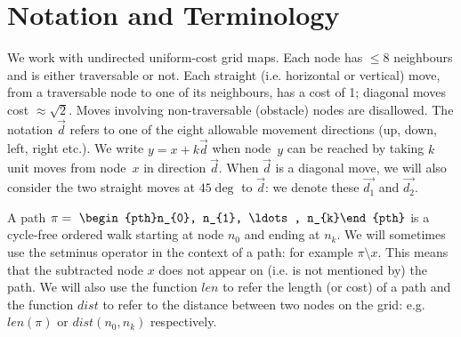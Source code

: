 \section{Notation and Terminology}
\label{sec:notation}
We work with undirected uniform-cost grid maps.  Each node has $\leq 8$
neighbours and is either traversable or not.  Each straight (i.e. horizontal or vertical) move,
from a traversable node to one of its neighbours, has a cost of 1; diagonal
moves cost $\approx\sqrt 2$.  Moves involving non-traversable (obstacle) nodes
are disallowed.  The notation $\vec{d}$ refers to one of the eight allowable
movement directions (up, down, left, right etc.).  We write $y = x + k\vec{d}$
when node~$y$ can be reached by taking $k$ unit moves from node~$x$ in direction
$\vec{d}$.  When $\vec{d}$ is a diagonal move, we will also consider the two
straight moves at $45\deg$ to $\vec{d}$: we denote these $\vec{d_1}$ and
$\vec{d_2}$.

A path $\pi =~\begin{pth}n_{0}, n_{1}, \ldots , n_{k}\end{pth}$ is a cycle-free
ordered walk starting at node $n_{0}$ and ending at $n_{k}$.  We will sometimes
use the setminus operator in the context of a path: for example $\pi \setminus
x$. This means that the subtracted node $x$ does not appear on (i.e. is not
mentioned by) the path.  We will also use the function $len$ to refer the length
(or cost) of a path and the function $dist$ to refer to the distance between two
nodes on the grid: e.g. $len(\pi)$ or $dist(n_{0}, n_{k})$ respectively.  



